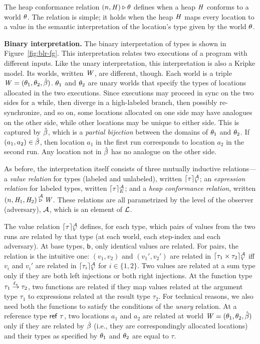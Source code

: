 The heap conformance relation $(n,\mathit{H}) \overset{}\triangleright \theta$ defines
when a heap $\mathit{H}$ conforms to a world $\theta$. The relation is
simple; it holds when the heap $\mathit{H}$ maps every location to a value
in the semantic interpretation of the location's type given by the
world $\theta$.


\medskip
\noindent \textbf{Binary interpretation.}
%
The binary interpretation of types is shown in
Figure~\ref{fig:blr-fg}. This interpretation relates two executions of
a program with different inputs. Like the unary interpretation, this
interpretation is also a Kripke model. Its worlds, written $\mathit{W}$,
are different, though. Each world is a triple $\mathit{W} = (\theta_1,
\theta_2, \hat{\beta})$. $\theta_1$ and $\theta_2$ are unary worlds that
specify the types of locations allocated in the two executions. Since
executions may proceed in sync on the two sides for a while, then
diverge in a high-labeled branch, then possibly re-synchronize, and so
on, some locations allocated on one side may have analogues on the
other side, while other locations may be unique to either side. This
is captured by $\hat{\beta}$, which is a \emph{partial bijection} between the
domains of $\theta_1$ and $\theta_2$. If $(a_1, a_2) \in \hat{\beta}$, then
location $a_1$ in the first run corresponds to location $a_2$ in the
second run. Any location not in $\hat{\beta}$ has no analogue on the other
side.

As before, the interpretation itself consists of three mutually
inductive relations---a \emph{value relation} for types (labeled and
unlabeled), written $\lceil \tau \rceil_{V}^{\mathcal{A}}$; an \emph{expression relation} for
labeled types, written $\lceil \tau \rceil_{E}^{\mathcal{A}}$; and a \emph{heap conformance
  relation}, written $(n, \mathit{H}_1, \mathit{H}_2) \overset{\mathcal{A}}\triangleright
\mathit{W}$. These relations are all parametrized by the level of the
observer (adversary), $\mathcal{A}$, which is an element of $\mathcal{L}$.

The value relation $\lceil \tau \rceil_{V}^{\mathcal{A}}$ defines, for each type, which pairs
of values from the two runs are related by that type (at each world,
each step-index and each adversary). At base types, $\mathsf{b}$, only
identical values are related. For pairs, the relation is the intuitive
one: $(v_1,v_2)$ and $(v_1',v_2')$ are related in $\lceil \tau_1 \times
  \tau_2 \rceil_{V}^{\mathcal{A}}$ iff $v_i$ and $v_i'$ are related in $\lceil \tau_i \rceil_{V}^{\mathcal{A}}$ for $i
\in \{1,2\}$. Two values are related at a sum type only if they are
both left injections or both right injections. At the function type
$\tau_1 \overset{\ell_e}\to \tau_2$, two functions are related if they map values
related at the argument type $\tau_1$ to expressions related at the
result type $\tau_2$. For technical reasons, we also need both the
functions to satisfy the conditions of the \emph{unary} relation. At a
reference type $\mathsf{ref}~\tau$, two locations $a_1$ and $a_2$ are related
at world $\mathit{W} = (\theta_1, \theta_2, \hat{\beta})$ only if they are
related by $\hat{\beta}$ (i.e., they are correspondingly allocated locations)
and their types as specified by $\theta_1$ and $\theta_2$ are equal
to $\tau$.

